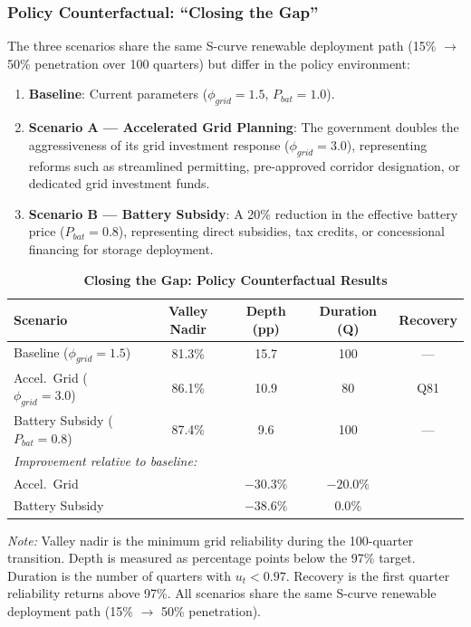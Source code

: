 \documentclass[12pt, a4paper]{article}
\begin{document}
\subsubsection{Policy Counterfactual: ``Closing the Gap''}

The three scenarios share the same S-curve renewable deployment path (15\% $\to$ 50\% penetration over 100 quarters) but differ in the policy environment:

\begin{enumerate}
    \item \textbf{Baseline}: Current parameters ($\phi_{grid} = 1.5$, $P_{bat} = 1.0$).
    \item \textbf{Scenario A --- Accelerated Grid Planning}: The government doubles the aggressiveness of its grid investment response ($\phi_{grid} = 3.0$), representing reforms such as streamlined permitting, pre-approved corridor designation, or dedicated grid investment funds.
    \item \textbf{Scenario B --- Battery Subsidy}: A 20\% reduction in the effective battery price ($P_{bat} = 0.8$), representing direct subsidies, tax credits, or concessional financing for storage deployment.
\end{enumerate}

\begin{table}[H]
    \centering
    \caption{\textbf{Closing the Gap: Policy Counterfactual Results}}
    \label{tab:closing_gap}
    \renewcommand{\arraystretch}{1.3}
    \small
    \begin{tabular}{l c c c c}
        \toprule
        \textbf{Scenario} & \textbf{Valley Nadir} & \textbf{Depth (pp)} & \textbf{Duration (Q)} & \textbf{Recovery} \\
        \midrule
        Baseline ($\phi_{grid} = 1.5$) & 81.3\% & 15.7 & 100 & --- \\
        Accel.\ Grid ($\phi_{grid} = 3.0$) & 86.1\% & 10.9 & 80 & Q81 \\
        Battery Subsidy ($P_{bat} = 0.8$) & 87.4\% & 9.6 & 100 & --- \\
        \midrule
        \multicolumn{5}{l}{\textit{Improvement relative to baseline:}} \\
        Accel.\ Grid & & $-30.3\%$ & $-20.0\%$ & \\
        Battery Subsidy & & $-38.6\%$ & $0.0\%$ & \\
        \bottomrule
    \end{tabular}
    \vspace{0.2cm}
    \parbox{\textwidth}{\footnotesize \textit{Note:} Valley nadir is the minimum grid reliability during the 100-quarter transition. Depth is measured as percentage points below the 97\% target. Duration is the number of quarters with $u_t < 0.97$. Recovery is the first quarter reliability returns above 97\%. All scenarios share the same S-curve renewable deployment path (15\% $\to$ 50\% penetration).}
\end{table}
\end{document}
